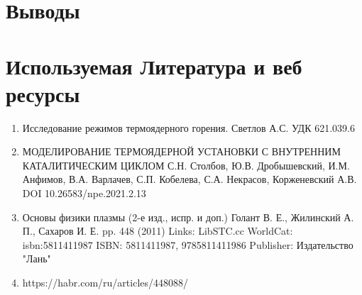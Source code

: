 \documentclass[a4paper,11pt]{article}
\begin{document}
\section{Выводы} 



\newpage
\section{Используемая Литература и веб ресурсы}
\begin{enumerate}
	\item Исследование режимов термоядерного горения. Светлов А.С. УДК 621.039.6
	\item МОДЕЛИРОВАНИЕ ТЕРМОЯДЕРНОЙ УСТАНОВКИ С ВНУТРЕННИМ КАТАЛИТИЧЕСКИМ ЦИКЛОМ С.Н. Столбов, Ю.В. Дробышевский, И.М. Анфимов, В.А. Варлачев, С.П. Кобелева, С.А. Некрасов, Корженевский А.В. DOI 10.26583/npe.2021.2.13
	\item Основы физики плазмы (2-е изд., испр. и доп.) Голант В. Е., Жилинский А. П., Сахаров И. Е. pp. 448 (2011) Links: LibSTC.cc WorldCat: isbn:5811411987 	ISBN: 5811411987, 9785811411986  Publisher: Издательство "Лань" 
	\item https://habr.com/ru/articles/448088/
\end{enumerate}



\end{document}
